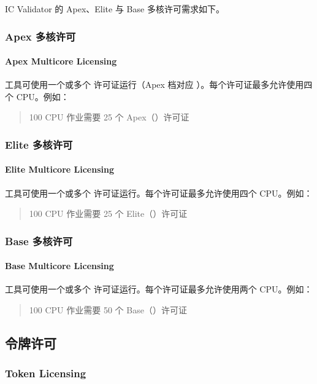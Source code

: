 IC Validator 的 Apex、Elite 与 Base 多核许可需求如下。

\subsubsection{Apex 多核许可}
\paragraph*{Apex Multicore Licensing}

工具可使用一个或多个  许可证运行（Apex 档对应 ）。每个许可证最多允许使用四个 CPU。例如：
\begin{quote}
100 CPU 作业需要 25 个 Apex（）许可证
\end{quote}

\subsubsection{Elite 多核许可}
\paragraph*{Elite Multicore Licensing}

工具可使用一个或多个  许可证运行。每个许可证最多允许使用四个 CPU。例如：
\begin{quote}
100 CPU 作业需要 25 个 Elite（）许可证
\end{quote}

\subsubsection{Base 多核许可}
\paragraph*{Base Multicore Licensing}

工具可使用一个或多个  许可证运行。每个许可证最多允许使用两个 CPU。例如：
\begin{quote}
100 CPU 作业需要 50 个 Base（）许可证
\end{quote}

\subsection{令牌许可}
\subsubsection*{Token Licensing}

